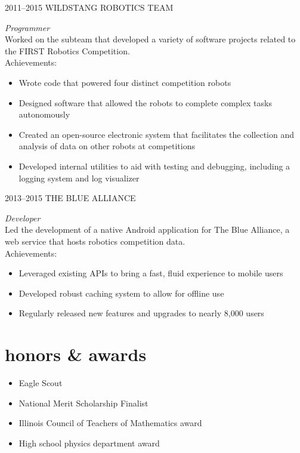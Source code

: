 \documentclass[]{friggeri-cv} %
\begin{document}
\begin{entrylist}


\entry
{2011--2015}
{WILDSTANG ROBOTICS TEAM}
{}
{\emph{Programmer} \\
Worked on the subteam that developed a variety of software projects related to the FIRST Robotics Competition. \\
Achievements:
\begin{itemize}
\item Wrote code that powered four distinct competition robots
\item Designed software that allowed the robots to complete complex tasks autonomously
\item Created an open-source electronic system that facilitates the collection and analysis of data on other robots at competitions
\item Developed internal utilities to aid with testing and debugging, including a logging system and log visualizer
\end{itemize}}


\entry
{2013--2015}
{THE BLUE ALLIANCE}
{}
{\emph{Developer} \\
Led the development of a native Android application for The Blue Alliance, a web service that hosts robotics competition data. \\
Achievements:
\begin{itemize}
\item Leveraged existing APIs to bring a fast, fluid experience to mobile users
\item Developed robust caching system to allow for offline use
\item Regularly released new features and upgrades to nearly 8,000 users
\end{itemize}}

\end{entrylist}



\section{honors \& awards}

\begin{itemize}
\item Eagle Scout
\item National Merit Scholarship Finalist
\item Illinois Council of Teachers of Mathematics award
\item High school physics department award
\end{itemize}
\end{document}
